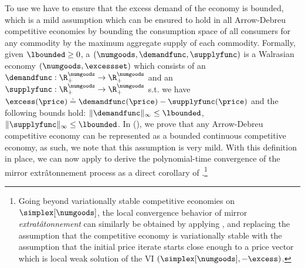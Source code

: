 To use  we have to ensure that the excess demand of the economy is bounded, which is a mild assumption which can be ensured to hold in all Arrow-Debreu competitive economies by bounding the consumption space of all consumers for any commodity by the maximum aggregate supply of each commodity. Formally,
given $\lbounded \geq 0$, a  $(\numgoods, \demandfunc, \supplyfunc)$  is a Walrasian economy $(\numgoods, \excessset)$ which consists of an  $\demandfunc: \R^\numgoods_+ \to \R^\numgoods_+$ and an  $\supplyfunc: \R^\numgoods_+ \to \R^\numgoods_+$ s.t. we have $\excess(\price) \doteq \demandfunc(\price) - \supplyfunc(\price)$ and the following bounds hold:
$
\|\demandfunc\|_\infty \leq \lbounded
$,
$\|\supplyfunc\|_\infty \leq \lbounded
$. In  (), we prove that any Arrow-Debreu competitive economy \cite{arrow-debreu} can be represented as a bounded continuous competitive economy, as such, we note that this assumption is very mild.
% 
With this definition in place, we can now apply  to derive the polynomial-time convergence of the mirror extr\^atonnement process as a direct corollary of .\footnote{Going beyond variationally stable competitive economies on $\simplex[\numgoods]$, the local convergence behavior of mirror \emph{extrat\^atonnement} can similarly be obtained by applying , and replacing the assumption that the competitive economy is variationally stable with the assumption that the initial price iterate starts close enough to a price vector which is local weak solution of the VI $(\simplex[\numgoods], -\excess)$.}

